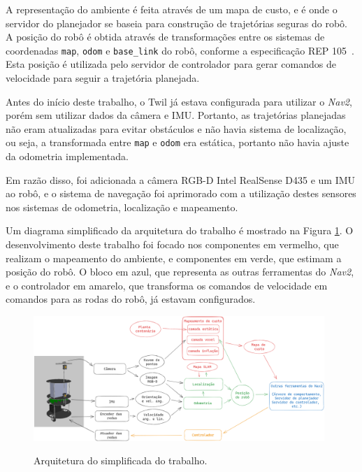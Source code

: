 \documentclass[repeatfields,xlists,xpacks,oneside,yearsonly]{ufrgscca}
\begin{document}
A representação do ambiente é feita através de um mapa de custo, e é
onde o servidor do planejador se baseia para construção de
trajetórias seguras do robô. A posição do robô é obtida através de
transformações entre os sistemas de coordenadas \texttt{map},
\texttt{odom} e \texttt{base\_link} do robô, conforme a especificação
REP 105~\cite{rep_105}. Esta posição é utilizada pelo servidor de
controlador para gerar comandos de velocidade para seguir a
trajetória planejada.

Antes do início deste trabalho, o Twil já estava configurada para
utilizar o \textit{Nav2}, porém sem utilizar dados da câmera e IMU.
Portanto, as trajetórias planejadas não eram atualizadas para evitar
obstáculos e não havia sistema de localização, ou seja, a
transformada entre \texttt{map} e \texttt{odom} era estática,
portanto não havia ajuste da odometria implementada.

Em razão disso, foi adicionada a câmera RGB-D Intel RealSense D435 e
um IMU ao robô, e o sistema de navegação foi aprimorado com a
utilização destes sensores nos sistemas de odometria, localização e
mapeamento.

Um diagrama simplificado da arquitetura do trabalho é mostrado na
Figura \ref{fig:arq_trabalho}. O desenvolvimento deste trabalho foi
focado nos componentes em vermelho, que realizam o mapeamento do
ambiente, e componentes em verde, que estimam a posição do robô. O
bloco em azul, que representa as outras ferramentas do \textit{Nav2},
e o controlador em amarelo, que transforma os comandos de velocidade
em comandos para as rodas do robô, já estavam configurados.

\begin{figure}[h]
    {
        \centering
        \caption{Arquitetura do simplificada do trabalho.}
        \label{fig:arq_trabalho}
        \includegraphics[width=0.98\textwidth]{arquitetura_simplificadav3.png}\\
    }
\end{figure}
\end{document}
